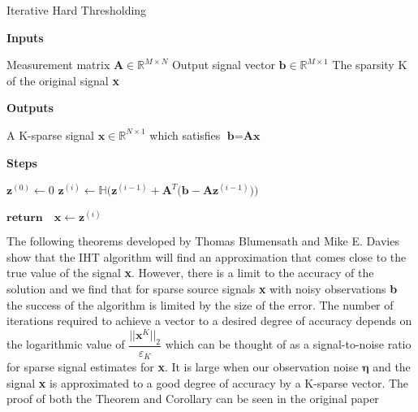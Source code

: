 \documentclass[titlepage,oneside, 12pt]{book}
\theoremstyle{break}
\begin{document}
\begin{algorithm}
  \caption{Iterative Hard Thresholding}
  \bigskip	
  \textbf{Inputs}%
  \begin{algorithmic}[1]
    \State Measurement matrix $\textbf{A} \in \mathbb{R}^{M \times N}$
    \State Output signal vector $\textbf{b} \in \mathbb{R}^{M \times 1}$
    \State The sparsity K of the original signal \textbf{x}
  \end{algorithmic}
  \bigskip  
  \textbf{Outputs}%
  \begin{algorithmic}[1]
       \State A K-sparse signal $\textbf{x}\in \mathbb{R}^{N \times 1}$ which satisfies $\textbf{b} = \textbf{A}\textbf{x}$
  \end{algorithmic}
  \bigskip
  \textbf{Steps}%
  \begin{algorithmic}[1]
	\State $\textbf{z}^{(0)} \gets 0$
	\State $\textbf{z}^{(i)} \gets \mathbb{H}\big(\textbf{z}^{(i - 1)} + \textbf{A}^{T}\big(\textbf{b} - \textbf{A}\textbf{z}^{(i-1)}\big)\big)$

   \EndFor
   
   \State $\textbf{return} \quad \textbf{x} \gets \textbf{z}^{(i)}$
   \EndProcedure

  \end{algorithmic}
  
  \end{algorithm}
  \newpage 

The following theorems developed by Thomas Blumensath and Mike E. Davies\cite{ItThresh} show that the IHT algorithm will find an approximation that comes close to the true value of the signal \textbf{x}. However, there is a limit to the accuracy of the solution and we find that for sparse source signals \textbf{x} with noisy observations \textbf{b} the success of the algorithm is limited by the size of the error. The number of iterations required to achieve a vector to a desired degree of accuracy depends on the logarithmic value of $\dfrac{||\textbf{x}^{K}||_{2}}{\varepsilon_{K}}$ which can be thought of as a signal-to-noise ratio for sparse signal estimates for \textbf{x}. It is large when our observation noise $\pmb{\eta}$ and the signal \textbf{x} is approximated to a good degree of accuracy by a K-sparse vector. The proof of both the Theorem and Corollary can be seen in the original paper \cite{ItThresh}
\end{document}
